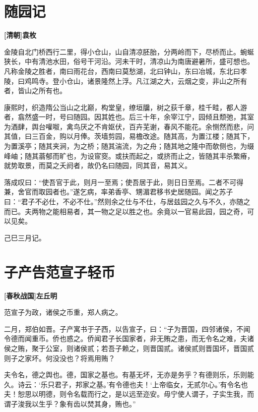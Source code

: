 \documentclass[UTF8,titlepage,oneside]{ctexbook}
\begin{document}
\chapter*{随园记}
\begin{center}
	\textbf{[清朝]袁枚}
\end{center}


金陵自北门桥西行二里，得小仓山，山自清凉胚胎，分两岭而下，尽桥而止。蜿蜒狭长，中有清池水田，俗号干河沿。河未干时，清凉山为南唐避暑所，盛可想也。凡称金陵之胜者，南曰雨花台，西南曰莫愁湖，北曰钟山，东曰冶城，东北曰孝陵，曰鸡鸣寺。登小仓山，诸景隆然上浮。凡江湖之大，云烟之变，非山之所有者，皆山之所有也。


康熙时，织造隋公当山之北巅，构堂皇，缭垣牖，树之荻千章，桂千畦，都人游者，翕然盛一时，号曰随园。因其姓也。后三十年，余宰江宁，园倾且颓弛，其室为酒肆，舆台嚾呶，禽鸟厌之不肯妪伏，百卉芜谢，春风不能花。余恻然而悲，问其值，曰三百金，购以月俸。茨墙剪园，易檐改途。随其高，为置江楼；随其下，为置溪亭；随其夹涧，为之桥；随其湍流，为之舟；随其地之隆中而欹侧也，为缀峰岫；随其蓊郁而旷也，为设宧窔。或扶而起之，或挤而止之，皆随其丰杀繁瘠，就势取景，而莫之夭阏者，故仍名曰随园，同其音，易其义。


落成叹曰：“使吾官于此，则月一至焉；使吾居于此，则日日至焉。二者不可得兼，舍官而取园者也。”遂乞病，率弟香亭、甥湄君移书史居随园。闻之苏子曰：“君子不必仕，不必不仕。”然则余之仕与不仕，与居兹园之久与不久，亦随之而已。夫两物之能相易者，其一物之足以胜之也。余竟以一官易此园，园之奇，可以见矣。


己巳三月记。 



\chapter*{子产告范宣子轻币}
\begin{center}
	\textbf{[春秋战国]左丘明}
\end{center}


范宣子为政，诸侯之币重，郑人病之。


二月，郑伯如晋。子产寓书于子西，以告宣子，曰：“子为晋国，四邻诸侯，不闻令德而闻重币。侨也惑之。侨闻君子长国家者，非无贿之患，而无令名之难，夫诸侯之贿，聚于公室，则诸侯贰；若吾子赖之，则晋国贰。诸侯贰则晋国坏，晋国贰则子之家坏。何没没也？将焉用贿？


夫令名，德之舆也。德，国家之基也。有基无坏，无亦是务乎？有德则乐，乐则能久。诗云：‘乐只君子，邦家之基。’有令德也夫！‘上帝临女，无贰尔心。’有令名也夫！恕思以明德，则令名载而行之，是以远至迩安。毋宁使人谓子，子实生我，而谓子浚我以生乎？象有齿以焚其身，贿也。”
\end{document}
